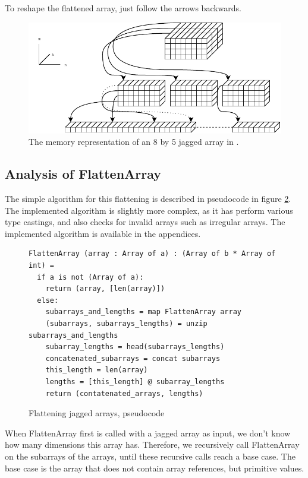 To reshape the flattened array, just follow the arrows backwards.

\begin{figure}[H]
  \centering
  \includegraphics[scale=1.4, angle=270]{chapters/figs/jaggedtoflat.pdf}
  \caption{The memory representation of an 8 by 5 jagged array in \csharp{}.}
  \label{fig:jaggedarraydrawing}
\end{figure}



\clearpage
\subsection{Analysis of FlattenArray}
The simple algorithm for this flattening is described in pseudocode in figure
\ref{fig:flattenarray}. The implemented algorithm is slightly more complex, as
it has perform various type castings, and also checks for invalid arrays such as
irregular arrays.
The implemented algorithm is available in the appendices.

\begin{figure}[h]
  \centering
\begin{verbatim}
FlattenArray (array : Array of a) : (Array of b * Array of int) =
  if a is not (Array of a):
    return (array, [len(array)])
  else:
    subarrays_and_lengths = map FlattenArray array
    (subarrays, subarrays_lengths) = unzip subarrays_and_lengths
    subarray_lengths = head(subarrays_lengths)
    concatenated_subarrays = concat subarrays
    this_length = len(array)
    lengths = [this_length] @ subarray_lengths
    return (contatenated_arrays, lengths)
\end{verbatim}
  \caption{Flattening jagged arrays, pseudocode}
  \label{fig:flattenarray}
\end{figure}

When FlattenArray first is called with a jagged array as input, we don't know
how many dimensions this array has. Therefore, we recursively call FlattenArray
on the subarrays of the arrays, until these recursive calls reach a base case.
The base case is the array that does not contain array references, but primitive
values.

